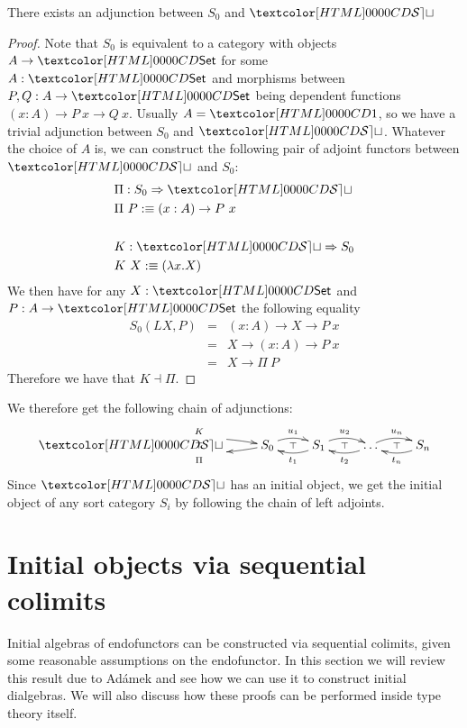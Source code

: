 \begin{proposition}
  There exists an adjunction between $S_0$ and $\SET$
\end{proposition}

\begin{proof}
  Note that $S_0$ is equivalent to a category with objects
  $A \to \Set$ for some $A : \Set$ and morphisms between
  $P, Q : A \to \Set$ being dependent functions
  $(x : A) \to P\ x \to Q\ x$. Usually $A = \unitty$, so we have a
  trivial adjunction between $S_0$ and $\SET$. Whatever the choice of
  $A$ is, we can construct the following pair of adjoint functors
  between $\SET$ and $S_0$:
  \begin{align*}
    &\Pi : \Func{S_0}{\SET} \\
    &\Pi\ P \ddefeq (x : A) \to P\ x \\
    \\
    &K : \Func{\SET}{S_0} \\
    &K\ X \ddefeq (\lambda x . X)
  \end{align*}
  We then have for any $X : \Set$ and $P : A \to \Set$ the following equality
  \begin{align*}
  S_0(LX , P) &=& (x : A) \to X \to P\ x \\
    &=& X \to (x : A) \to P\ x \\
    &=& X \to \Pi\ P
  \end{align*}
  Therefore we have that $K \dashv \Pi$.
\end{proof}

We therefore get the following chain of adjunctions:
$$
\xymatrix{
\SET \ar@/^/[r]^{K}
\ar@{}[r]|{\top} 
&S_0 \ar@/^/[l]^{\Pi} \ar@/^/[r]^{u_1} 
\ar@{}[r]|{\top} 
&S_1 \ar@/^/[l]^{t_1} \ar@/^/[r]^{u_2} 
\ar@{}[r]|{\top} 
&\hdots \ar@/^/[l]^{t_2} \ar@/^/[r]^{u_n} 
\ar@{}[r]|{\top} 
&S_n \ar@/^/[l]^{t_n}
}
$$
Since $\SET$ has an initial object, we get the initial object of any
sort category $S_i$ by following the chain of left adjoints.

\section{Initial objects via sequential colimits}
\label{sequential-colimits}

Initial algebras of endofunctors can be constructed via sequential
colimits, given some reasonable assumptions on the endofunctor. In
this section we will review this result due to Ad\'amek
\cite{Adamek1979} and see how we can use it to construct initial
dialgebras. We will also discuss how these proofs can be performed
inside type theory itself.

